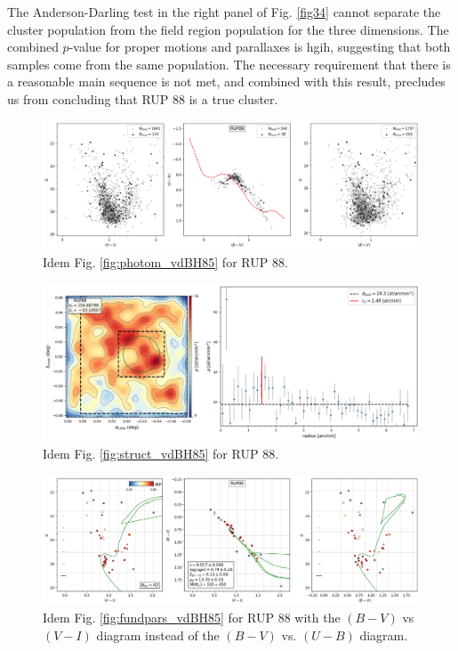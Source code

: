 \documentclass[draft]{aa}
\begin{document}
The Anderson-Darling test in the right panel of Fig. \ref{fig34} cannot
separate the cluster population from the field region population for the
three dimensions. The combined $p$-value for proper motions and
parallaxes is hgih, suggesting that both samples come from the same
population. The necessary requirement that there is a reasonable main
sequence is not met, and combined with this result, precludes
us from concluding that RUP 88 is a true cluster.

\begin{figure}[ht]
    \centering
    \includegraphics[width=\hsize]{../figs/obs_RUP88.png}
    \caption{Idem Fig. \ref{fig:photom_vdBH85} for RUP 88.}
    \label{fig31}
\end{figure}
\begin{figure}[ht]
    \centering
    \includegraphics[width=\hsize]{../figs/dmap_rup88.png}
    \caption{Idem Fig. \ref{fig:struct_vdBH85} for RUP 88.}
    \label{fig32}
\end{figure}
\begin{figure}[ht]
    \centering
    \includegraphics[width=\hsize]{../figs/cmds_rup88.png}
    \caption{Idem Fig. \ref{fig:fundpars_vdBH85} for RUP 88
with the $(B-V)$ vs $(V-I)$ diagram instead of the $(B-V)$ vs. $(U-B)$
diagram.}
    \label{fig33}
\end{figure}
\end{document}
